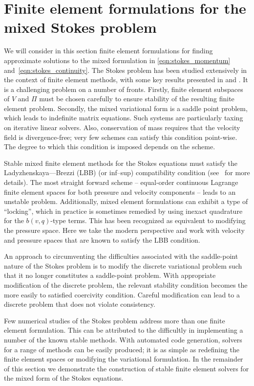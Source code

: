 \section{Finite element formulations for the mixed Stokes problem}

We will consider in this section finite element formulations
for finding approximate solutions to the mixed formulation in
\eqref{eqn:stokes_momentum} and~\eqref{eqn:stokes_continuity}.  The Stokes
problem has been studied extensively in the context of finite element
methods, with some key results presented in \citet{BrezziFortin1991}
and \citet{BrennerScott2008}.  It is a challenging problem on a number
of fronts.  Firstly, finite element subspaces of $V$ and $\Pi$ must be
chosen carefully to ensure stability of the resulting finite element
problem. Secondly, the mixed variational form is a saddle point problem,
which leads to indefinite matrix equations. Such systems are particularly
taxing on iterative linear solvers.  Also, conservation of mass requires
that the velocity field is divergence-free; very few schemes can satisfy
this condition point-wise.  The degree to which this condition is imposed
depends on the scheme.

Stable mixed finite element methods for the Stokes equations must satisfy
the Ladyzhenskaya--\babuska--Brezzi (LBB) (or inf--sup) compatibility
condition (see~\citet{BrezziFortin1991} for more details).  The most
straight forward scheme -- equal-order continuous Lagrange finite element
spaces for both pressure and velocity components -- leads to an unstable
problem.  Additionally, mixed element formulations can exhibit a type of
``locking'', which in practice is sometimes remedied by using inexact
quadrature for the $b(v, q)$-type terms.  This has been recognized as
equivalent to modifying the pressure space.  Here we take the modern
perspective and work with velocity and pressure spaces that are known
to satisfy the LBB condition.

An approach to circumventing the difficulties associated with the
saddle-point nature of the Stokes problem is to modify the discrete
variational problem such that it no longer constitutes a saddle-point
problem. With appropriate modification of the discrete problem, the
relevant stability condition becomes the more easily to satisfied coercivity
condition. Careful modification can lead to a discrete problem that does
not violate consistency.

Few numerical studies of the Stokes problem address more than one finite
element formulation. This can be attributed to the difficultly in implementing
a number of the known stable methods. With automated code generation,
solvers for a range of methods can be easily produced; it is as simple
as redefining the finite element spaces or modifying the variational
formulation.  In the remainder of this section we demonstrate the
construction of stable finite element solvers for the mixed form of the
Stokes equations.

